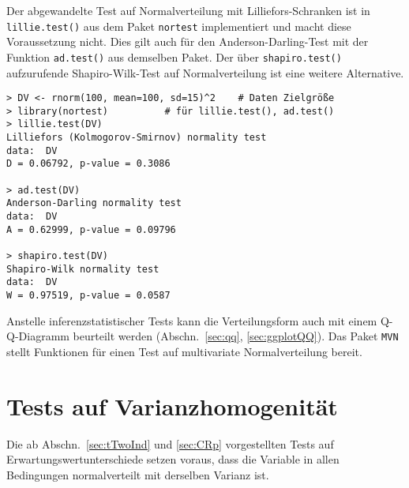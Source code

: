 Der abgewandelte Test auf Normalverteilung mit Lilliefors-Schranken ist in \lstinline!lillie.test()! aus dem Paket \lstinline!nortest! \cite{Gross2015} implementiert und macht diese Voraussetzung nicht. Dies gilt auch für den   Anderson-Darling-Test mit der Funktion \lstinline!ad.test()! aus demselben Paket. Der über \lstinline!shapiro.test()! aufzurufende Shapiro-Wilk-Test auf Normalverteilung ist eine weitere Alternative.
\begin{lstlisting}
> DV <- rnorm(100, mean=100, sd=15)^2    # Daten Zielgröße
> library(nortest)          # für lillie.test(), ad.test()
> lillie.test(DV)
Lilliefors (Kolmogorov-Smirnov) normality test
data:  DV
D = 0.06792, p-value = 0.3086
  
> ad.test(DV)
Anderson-Darling normality test
data:  DV
A = 0.62999, p-value = 0.09796

> shapiro.test(DV)
Shapiro-Wilk normality test
data:  DV
W = 0.97519, p-value = 0.0587
\end{lstlisting}

Anstelle inferenzstatistischer Tests kann die Verteilungsform auch mit einem Q-Q-Diagramm beurteilt werden (Abschn.\ \ref{sec:qq}, \ref{sec:ggplotQQ}). Das Paket \lstinline!MVN! \cite{Korkmaz2021} stellt Funktionen für einen Test auf multivariate Normalverteilung bereit.

\section{Tests auf Varianzhomogenität}
\label{sec:varHom}

Die ab Abschn.\ \ref{sec:tTwoInd} und \ref{sec:CRp} vorgestellten Tests auf Erwartungswertunterschiede setzen voraus, dass die Variable in allen Bedingungen normalverteilt mit derselben Varianz ist.


